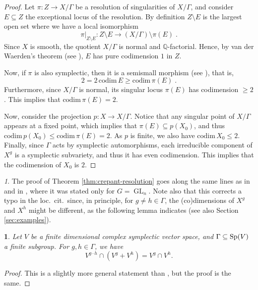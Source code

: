 \documentclass[11pt,english]{amsart}
\numberwithin{equation}{section}
\numberwithin{figure}{section}
\theoremstyle{plain}
\theoremstyle{plain}
\newtheorem{lem}[thm]{\protect\lemmaname}
\theoremstyle{definition}
\theoremstyle{remark}
\newtheorem{rem}[thm]{\protect\remarkname}
\newcommand{\GL}{\operatorname{GL}}
\providecommand{\remarkname}{Remark}
\providecommand{\lemmaname}{Lemma}
\begin{document}
\begin{proof}
Let $\pi:Z\to X/\Gamma$ be a resolution of singularities of $X/\Gamma$, and consider $E\subseteq Z$ the exceptional locus of the resolution.
By definition $Z\setminus E$ is the largest open set where we have
a local isomorphism
\[
\pi|_{Z\setminus E}:Z\setminus E\to(X/\Gamma)\setminus\pi(E)\; .
\]
Since $X$ is smooth, the quotient $X/\Gamma$ is normal and $\mathbb{Q}$-factorial.
Hence, by van der Waerden's theorem (see \cite[Thm 21.12.12]{EGA}),
$E$ has pure codimension $1$ in $Z$.

Now, if $\pi$ is also symplectic, then it is a semismall morphism
(see \cite[Lemma 2.11]{kaledin2006symplectic}), that is, 
\[
2=2\,\text{codim}\,E\geq\text{codim}\,\pi(E)\; .
\]
Furthermore, since $X/\Gamma$ is normal, its singular locus $\pi(E)$
has codimension $\geq2$. This implies that $\textrm{codim}\,\pi(E)=2$.

Now, consider the projection
$p:X\to X/\Gamma$. Notice that any singular point of $X/\Gamma$
appears at a fixed point, which implies that $\pi(E)\subseteq p(X_{0})$,
and thus $\textrm{codim}\,p(X_{0})\leq\textrm{codim}\,\pi(E)=2$.
As $p$ is finite, we also have $\textrm{codim}\,X_{0}\leq2$. Finally,
since $\Gamma$ acts by symplectic automorphisms, each irreducible
component of $X^{g}$ is a symplectic subvariety, and thus it has
even codimension. This implies that the codimension of $X_0$ is $2$.
\end{proof}

\begin{rem}
The proof of Theorem \ref{thm:crepant-resolution} goes along the same lines as in \cite{Fu} and in \cite{BFN},
where it was stated only for $G=\GL_{n}$.
Note also that this corrects a typo in the loc.\ cit.\ since, in principle, for $g\neq h\in \Gamma$, the (co)dimensions of $X^g$ and $X^h$ might be different, as the following lemma indicates (see also Section \ref{sec:examples}).
\end{rem}

\begin{lem}
Let $V$ be a finite dimensional complex symplectic vector space, and $\Gamma \subseteq \textup{Sp}(V)$ a finite subgroup. For $g,h\in \Gamma$, we have
\[
V^{g\cdot h} \cap (V^g+V^h) = V^g \cap V^h.
\]
\end{lem}
\begin{proof}
This is a slightly more general statement than \cite[Lemma A.16]{GK04}, but the proof is the same.
\end{proof}
\end{document}
